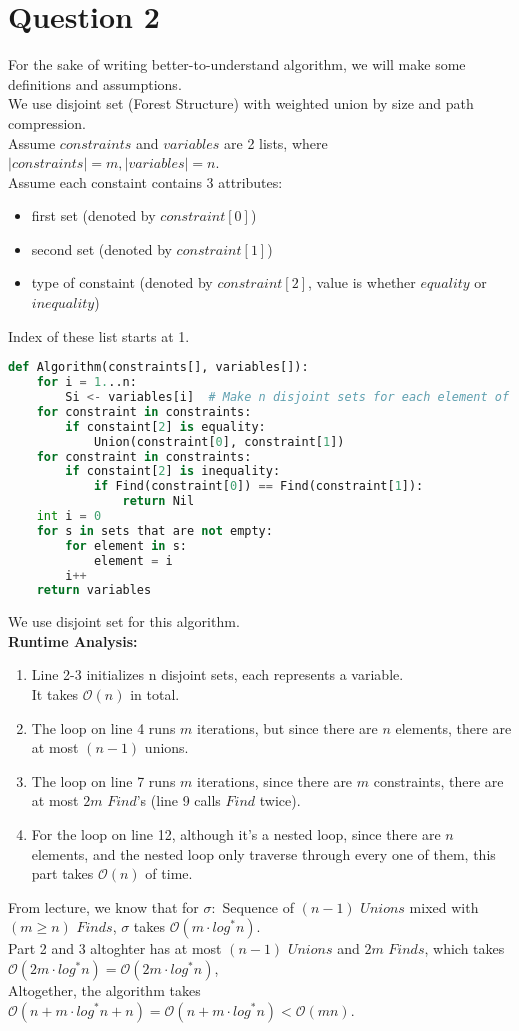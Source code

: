 \documentclass[10pt]{article}
\begin{document}
\newpage
\section*{Question 2}
For the sake of writing better-to-understand algorithm, we will make some definitions and assumptions.\\
We use disjoint set (Forest Structure) with weighted union by size and path compression.\\
Assume $constraints$ and $variables$ are 2 lists, where $|constraints|=m, |variables|=n$.\\
Assume each constaint contains 3 attributes: 
\begin{itemize}
\item first set (denoted by $constraint[0]$)
\item second set (denoted by $constraint[1]$)
\item type of constaint (denoted by $constraint[2]$, value is whether $equality$ or $inequality$)
\end{itemize}
Index of these list starts at 1.
\begin{lstlisting}[language=Python]
def Algorithm(constraints[], variables[]):
	for i = 1...n:
		Si <- variables[i]	# Make n disjoint sets for each element of variables named S1...Sn
	for constraint in constraints:
		if constaint[2] is equality:
			Union(constraint[0], constraint[1])
	for constraint in constraints:
		if constaint[2] is inequality:
			if Find(constraint[0]) == Find(constraint[1]):
				return Nil
	int i = 0
	for s in sets that are not empty:
		for element in s:
			element = i		
		i++
	return variables
\end{lstlisting}
We use disjoint set for this algorithm.\\
\textbf{Runtime Analysis:}
\begin{enumerate}
\item Line 2-3 initializes n disjoint sets, each represents a variable.\\
It takes $\mathcal{O}(n)$ in total.
\item The loop on line 4 runs $m$ iterations, but since there are $n$ elements, there are at most $(n-1)$ unions.
\item The loop on line 7 runs $m$ iterations, since there are $m$ constraints, there are at most $2m$ $Find$'s (line 9 calls $Find$ twice).
\item For the loop on line 12, although it's a nested loop, since there are $n$ elements, and the nested loop only traverse through every one of them, this part takes $\mathcal{O}(n)$ of time.
\end{enumerate}
From lecture, we know that for $\sigma:$ Sequence of $(n-1)$ $Unions$ mixed with $(m\geq n)$ $Finds$, $\sigma$ takes $\mathcal{O}(m\cdot log^*n)$.\\
Part 2 and 3 altoghter has at most $(n-1)$ $Unions$ and $2m$ $Finds$, which takes $\mathcal{O}(2m\cdot log^*n)=\mathcal{O}(2m\cdot log^*n)$,\\
Altogether, the algorithm takes $\mathcal{O}(n+m\cdot log^*n + n)=\mathcal{O}(n+m\cdot log^*n)<\mathcal{O}(mn)$.
\end{document}

